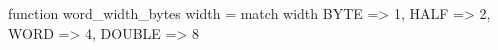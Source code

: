 function word_width_bytes width = match width {
  BYTE   => 1,
  HALF   => 2,
  WORD   => 4,
  DOUBLE => 8
}
